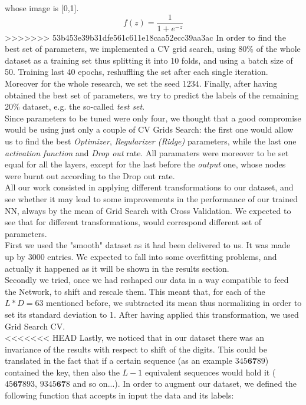\documentclass[prl,twocolumn]{revtex4-1}
\begin{document}
whose image is [0,1].
\begin{equation}
f(z) = \frac{1}{1+e^{-z}}
\end{equation}
>>>>>>> 53b453e39b31dfe561c611e18caa52ecc39aa3ac
In order to find the best set of parameters, we implemented a CV grid search, using 80\% of the whole dataset as a training set thus splitting it into 10 folds, and using a batch size of 50. Training last 40 epochs, reshuffling the set after each single iteration. Moreover for the whole research, we set the seed $1234$. Finally, after having obtained the best set of parameters, we try to predict the labels of the remaining 20\% dataset, e.g. the so-called \textit{test set}.\\
Since parameters to be tuned were only four, we thought that a good compromise would be using just only a couple of CV Grids Search: the first one would allow us to find the best \textit{Optimizer}, \textit{Regularizer (Ridge)} parameters, while the last one \textit{activation function} and \textit{Drop out} rate. All paramaters were moreover to be set equal for all the layers, except for the last before the \textit{output} one, whose nodes were burnt out according to the Drop out rate.\\
All our work consisted in applying different transformations to our dataset, and see whether it may lead to some improvements in the performance of our trained NN, always by the mean of Grid Search with Cross Validation. We expected to see that for different transformations, would correspond different set of parameters.\\
First we used the "smooth" dataset as it had been delivered to us. It was made up by 3000 entries. We expected to fall into some overfitting problems, and actually it happened as it will be shown in the results section.\\
Secondly we tried, once we had reshaped our data in a way compatible to feed the Network, to shift and rescale them. This meant that, for each of the $L*D = 63$ mentioned before, we subtracted its mean thus normalizing in order to set its standard deviation to 1. After having applied this transformation, we used Grid Search CV.\\
<<<<<<< HEAD
Lastly, we noticed that in our dataset there was an invariance of the results with respect to shift of the digits. This could be translated in the fact that if a certain sequence (as an example $345\textbf{67}89$) contained the key, then also the $L-1$ equivalent sequences would hold it ($45\textbf{67}893$, $9345\textbf{67}8$ and so on...). In order to augment our dataset, we defined the following function that accepts in input the data and its labels:
\end{document}
